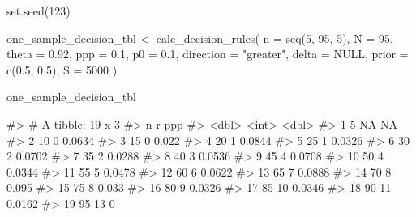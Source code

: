 \begin{Schunk}
\begin{Sinput}
set.seed(123)

one_sample_decision_tbl <- 
  calc_decision_rules(
    n = seq(5, 95, 5),
    N = 95, 
    theta = 0.92, 
    ppp = 0.1, 
    p0 = 0.1, 
    direction = "greater",
    delta = NULL, 
    prior = c(0.5, 0.5), 
    S = 5000
  )
\end{Sinput}
\end{Schunk}

\begin{Schunk}
\begin{Sinput}
one_sample_decision_tbl
\end{Sinput}
\begin{Soutput}
#> # A tibble: 19 x 3
#>        n     r     ppp
#>    <dbl> <int>   <dbl>
#>  1     5    NA NA     
#>  2    10     0  0.0634
#>  3    15     0  0.022 
#>  4    20     1  0.0844
#>  5    25     1  0.0326
#>  6    30     2  0.0702
#>  7    35     2  0.0288
#>  8    40     3  0.0536
#>  9    45     4  0.0708
#> 10    50     4  0.0344
#> 11    55     5  0.0478
#> 12    60     6  0.0622
#> 13    65     7  0.0888
#> 14    70     8  0.095 
#> 15    75     8  0.033 
#> 16    80     9  0.0326
#> 17    85    10  0.0346
#> 18    90    11  0.0162
#> 19    95    13  0
\end{Soutput}
\end{Schunk}

